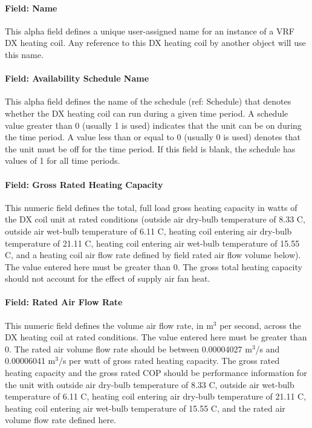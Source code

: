 \paragraph{Field: Name}\label{field-name-6-007}

This alpha field defines a unique user-assigned name for an instance of a VRF DX heating coil. Any reference to this DX heating coil by another object will use this name.

\paragraph{Field: Availability Schedule Name}\label{field-availability-schedule-name-2-004}

This alpha field defines the name of the schedule (ref: Schedule) that denotes whether the DX heating coil can run during a given time period. A schedule value greater than 0 (usually 1 is used) indicates that the unit can be on during the time period. A value less than or equal to 0 (usually 0 is used) denotes that the unit must be off for the time period. If this field is blank, the schedule has values of 1 for all time periods.

\paragraph{Field: Gross Rated Heating Capacity}\label{field-gross-rated-heating-capacity-1}

This numeric field defines the total, full load gross heating capacity in watts of the DX coil unit at rated conditions (outside air dry-bulb temperature of 8.33 C, outside air wet-bulb temperature of 6.11 C, heating coil entering air dry-bulb temperature of 21.11 C, heating coil entering air wet-bulb temperature of 15.55 C, and a heating coil air flow rate defined by field rated air flow volume below). The value entered here must be greater than 0. The gross total heating capacity should not account for the effect of supply air fan heat.

\paragraph{Field: Rated Air Flow Rate}\label{field-rated-air-flow-rate-1}

This numeric field defines the volume air flow rate, in m\(^{3}\) per second, across the DX heating coil at rated conditions. The value entered here must be greater than 0. The rated air volume flow rate should be between 0.00004027 m\(^{3}\)/s and 0.00006041 m\(^{3}\)/s per watt of gross rated heating capacity. The gross rated heating capacity and the gross rated COP should be performance information for the unit with outside air dry-bulb temperature of 8.33 C, outside air wet-bulb temperature of 6.11 C, heating coil entering air dry-bulb temperature of 21.11 C, heating coil entering air wet-bulb temperature of 15.55 C, and the rated air volume flow rate defined here.

